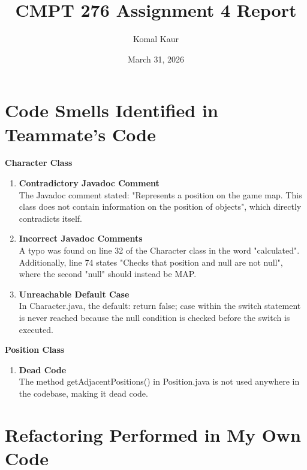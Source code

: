 \documentclass[12pt]{article}
\title{CMPT 276 Assignment 4 Report}
\author{Komal Kaur}
\date{March 31, 2026}
\begin{document}
\maketitle

\section{Code Smells Identified in Teammate's Code}

\noindent\textbf{Character Class}
\begin{enumerate}
    \item \textbf{Contradictory Javadoc Comment} \\
    The Javadoc comment stated: "Represents a position on the game map. This class does not contain information on the position of objects", which directly contradicts itself.

    \item \textbf{Incorrect Javadoc Comments} \\
    A typo was found on line 32 of the Character class in the word "calculated". Additionally, line 74 states "Checks that position and null are not null", where the second "null" should instead be MAP.

    \item \textbf{Unreachable Default Case} \\
    In Character.java, the default: return false; case within the switch statement is never reached because the null condition is checked before the switch is executed.
\end{enumerate}

\noindent\textbf{Position Class}
\begin{enumerate}
    \item \textbf{Dead Code} \\
    The method getAdjacentPositions() in Position.java is not used anywhere in the codebase, making it dead code.
\end{enumerate}

\newpage
\section{Refactoring Performed in My Own Code}
\end{document}
